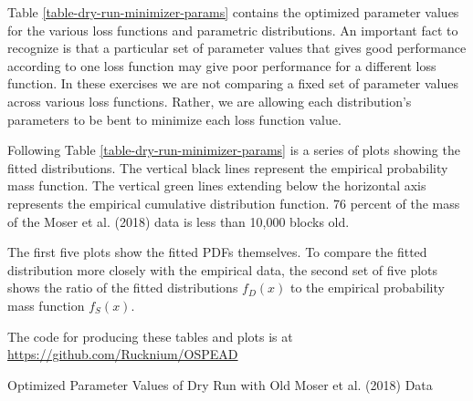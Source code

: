 \documentclass[english]{article}
\begin{document}
Table \ref{table-dry-run-minimizer-params} contains the optimized
parameter values for the various loss functions and parametric distributions.
An important fact to recognize is that a particular set of parameter
values that gives good performance according to one loss function
may give poor performance for a different loss function. In these
exercises we are not comparing a fixed set of parameter values across
various loss functions. Rather, we are allowing each distribution's
parameters to be bent to minimize each loss function value.

Following Table \ref{table-dry-run-minimizer-params} is a series
of plots showing the fitted distributions. The vertical black lines
represent the empirical probability mass function. The vertical green
lines extending below the horizontal axis represents the empirical
cumulative distribution function. 76 percent of the mass of the M{\:o}ser
et al. (2018) data is less than 10,000 blocks old.

The first five plots show the fitted PDFs themselves. To compare the
fitted distribution more closely with the empirical data, the second
set of five plots shows the ratio of the fitted distributions $f_{D}(x)$
to the empirical probability mass function $f_{S}(x)$.

The code for producing these tables and plots is at \href{https://github.com/Rucknium/OSPEAD}{https://github.com/Rucknium/OSPEAD}

\begin{table}[H]
\caption{Optimized Parameter Values of Dry Run with Old M{\:o}ser et al. (2018)
Data}



\label{table-dry-run-minimizer-params}
\end{table}
\end{document}
